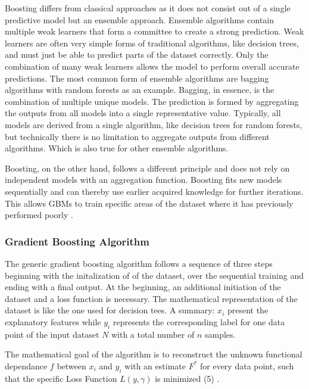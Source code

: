 Boosting differs from classical approaches as it does not consist out of a single predictive 
model but an ensemble approach. Ensemble algorithms contain multiple weak learners that form a 
committee to create a strong prediction. Weak learners are often very simple forms of traditional 
algorithms, like decision trees, and must just be able to predict parts of the dataset correctly. 
Only the combination of many weak learners allows the model to perform overall accurate 
predictions. The most common form of ensemble algorithms are bagging algorithms with random 
forests as an example. Bagging, in essence, is the combination of multiple unique models. The 
prediction is formed by aggregating the outputs from all models into a single representative 
value. Typically, all models are derived from a single algorithm, like decision trees for random 
forests, but technically there is no limitation to aggregate outputs from different algorithms. 
Which is also true for other ensemble algorithms. 

Boosting, on the other hand, follows a different principle and does not rely on independent 
models with an aggregation function. Boosting fits new models sequentially and can thereby use 
earlier acquired knowledge for further iterations. This allows GBMs to train specific areas of 
the dataset where it has previously performed poorly \cite[p.345f]{James2021}.  

\subsubsection{Gradient Boosting Algorithm}
\label{sec:Gradient Boosting Algorithm}

The generic gradient boosting algorithm follows a sequence of three steps beginning with the initalization of
of the dataset, over the sequential training and ending with a final output. At the beginning, an 
additional initiation of the dataset and a loss function is necessary. The mathematical 
representation of the dataset is like the one used for decision tees. A summary: \(x_{i}\) present the 
explanatory features while \(y_{i}\) represents the corresponding label for one data point of the input 
dataset \(N\) with a total number of \(n\) samples. 

The mathematical goal of the algorithm is to reconstruct the unknown functional dependance \(f\) 
between \(x_{i}\) and \(y_{i}\) with an estimate \(F^{*}\) for every data point, such that the specific Loss 
Function \(L(y, \gamma)\) is minimized (5) \cite[p.1189]{Friedman_2001} \cite[2.1]{Natekin2013}. 

